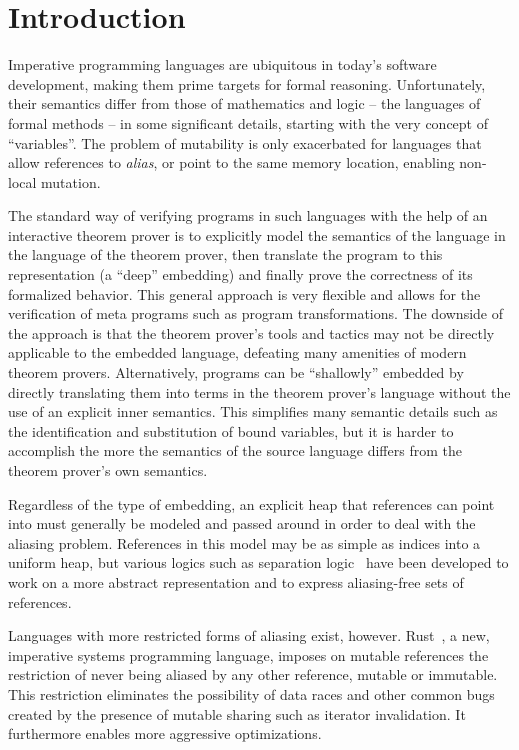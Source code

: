 \section{Introduction}

Imperative programming languages are ubiquitous in today's software development,
making them prime targets for formal reasoning. Unfortunately, their semantics
differ from those of mathematics and logic -- the languages of formal methods -- in some
significant details, starting with the very concept of ``variables''. The problem
of mutability is only exacerbated for languages that allow references to
\emph{alias}, or point to the same memory location, enabling non-local mutation.

The standard way of verifying programs in such languages with the help of an
interactive theorem prover is to explicitly model the semantics of the language
in the language of the theorem prover, then translate
the program to this representation (a ``deep'' embedding) and finally prove the
correctness of its formalized behavior. This general approach is very flexible
and allows for the verification of meta programs such as program transformations.
The downside of the approach is that the theorem prover's tools and tactics may
not be directly applicable to the embedded language, defeating many amenities of
modern theorem provers.
Alternatively, programs can be ``shallowly'' embedded by directly translating them
into terms in the theorem prover's language without the use of an explicit inner semantics.
This simplifies many semantic details such as the identification and
substitution of bound variables, but it is harder to accomplish the more the semantics
of the source language differs from the theorem prover's own semantics.

Regardless of the type of embedding,
an explicit heap that references can point into must generally be modeled and
passed around in order to deal with the aliasing problem. References in this model may be as simple as
indices into a uniform heap, but various logics such as separation logic~\cite{reynolds2002separation} have been developed to work on a more abstract representation and to express
aliasing-free sets of references.

Languages with more restricted forms of aliasing exist, however.
Rust~\cite{matsakis2014rust}, a new, imperative systems programming language,
imposes on mutable references the restriction of never being aliased by any
other reference, mutable or immutable. This restriction eliminates the
possibility of data races and other common bugs created by the presence of
mutable sharing such as iterator invalidation. It furthermore enables more
aggressive optimizations.

